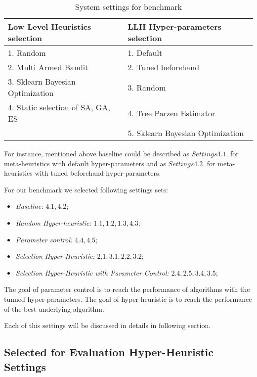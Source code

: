 
\begin{table}[h!]
	\centering
	\begin{tabular}{|l|l|}
		\hline
		\textbf{Low Level Heuristics selection} & \textbf{LLH Hyper-parameters selection} \\
		\hline
		1. Random & 1. Default \\
		2. Multi Armed Bandit & 2. Tuned beforehand \\
		3. Sklearn Bayesian Optimization & 3. Random \\
		4. Static selection of SA, GA, ES & 4. Tree Parzen Estimator \\
		& 5. Sklearn Bayesian Optimization\\
		\hline
	\end{tabular}
	
	\caption{System settings for benchmark}
	\label{evaluation: settings table}
\end{table}


For instance, mentioned above baseline could be described as $Settings 4.1.$ for meta-heuristics with default hyper-parameters and as $Settings 4.2.$ for meta-heuristics with tuned beforehand hyper-parameters.

For our benchmark we selected following settings sets:

\begin{itemize}
	\item \textit{Baseline:} $4.1, 4.2;$
	\item \textit{Random Hyper-heuristic:} $1.1, 1.2, 1.3, 4.3;$
	\item \textit{Parameter control:} $4.4, 4.5;$
	\item \textit{Selection Hyper-Heuristic:} $2.1, 3.1, 2.2, 3.2;$
	\item \textit{Selection Hyper-Heuristic with Parameter Control:} $2.4, 2.5, 3.4, 3.5;$
\end{itemize}

The goal of parameter control is to reach the performance of algorithms with the tunned hyper-parameters.
The goal of hyper-heuristic is to reach the performance of the best underlying algorithm.

Each of this settings will be discussed in details in following section.


\subsection{Selected for Evaluation Hyper-Heuristic Settings}
